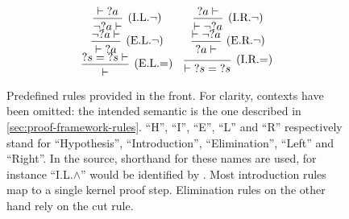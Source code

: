 \begin{figure}[H]
$$\begin{array}{c c}
  \frule{\vdash {?a}}{\neg {?a} \vdash}{I.L.$\neg$} & \frule{{?a} \vdash}{\vdash \neg {?a}}{I.R.$\neg$} \\
  \frule{\neg {?a} \vdash}{\vdash {?a}}{E.L.$\neg$} & \frule{\vdash \neg {?a}}{{?a} \vdash}{E.R.$\neg$} \\
  \frule{{?s} = {?s} \vdash}{\vdash}{E.L.$=$} & \frule{}{\vdash {?s} = {?s}}{I.R.$=$}
  \end{array}$$
  \caption[Rules]{Predefined rules provided in the front. For clarity, contexts have been omitted: the intended semantic is the one described in \autoref{sec:proof-framework-rules}. ``H'', ``I'', ``E'', ``L'' and ``R'' respectively stand for ``Hypothesis'', ``Introduction'', ``Elimination'', ``Left'' and ``Right''. In the source, shorthand for these names are used, for instance ``I.L.$\land$'' would be identified by . Most introduction rules map to a single kernel proof step. Elimination rules on the other hand rely on the cut rule.}
  \label{fig:rules-list-1}
\end{figure}

